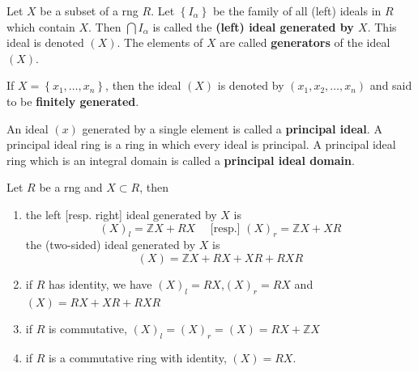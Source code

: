 \begin{definition}
    Let $X$ be a subset of a rng $R$. Let $\left\{I_\alpha \right\}$ be the family of all (left) ideals in $R$ which contain $X$.
    Then $\bigcap I_\alpha $ is called the \textbf{(left) ideal generated by $X$}. This ideal is denoted $(X)$. The elements of $X$ are called \textbf{generators} of the ideal $(X)$.

    If $X=\left\{x_1, \ldots, x_n\right\}$, then the ideal $(X)$ is denoted by $\left(x_1, x_2, \ldots, x_n\right)$ and said to be \textbf{finitely generated}.

    An ideal $(x)$  generated by a single element is called a \textbf{principal ideal}. A principal ideal ring is a ring in which every ideal is principal. A principal ideal ring which is an integral domain is called a \textbf{principal ideal domain}.
\end{definition}

\begin{theorem}
    \label{thm: Ideals generated by a set}
    Let $R$ be a rng and $X \subset R$,
    then
    \begin{enumerate}
        \item
              the left [resp. right] ideal generated by $X$ is
              \begin{equation*}
                  \left(X\right)_l
                  =
                  \mathbb{Z}X +RX
                  \quad  \text{  [resp.] }
                  \left(X\right)_r=\mathbb{Z}X +XR
              \end{equation*}
              the (two-sided) ideal generated by $X$ is
              \begin{equation*}
                  \left(X\right)
                  =
                  \mathbb{Z}X +RX+XR +RXR
              \end{equation*}
        \item
              if $R$ has identity, we have $\left(X\right)_l=RX$,$\left(X\right)_r=RX$ and $\left(X\right)=RX+XR+RXR$
        \item
              if $R$ is commutative, $\left(X\right)_l=\left(X\right)_r=\left(X\right)=RX+\mathbb{Z}X$
        \item
              if $R$ is a commutative ring with identity, $\left(X\right)=RX$.
    \end{enumerate}
\end{theorem}





